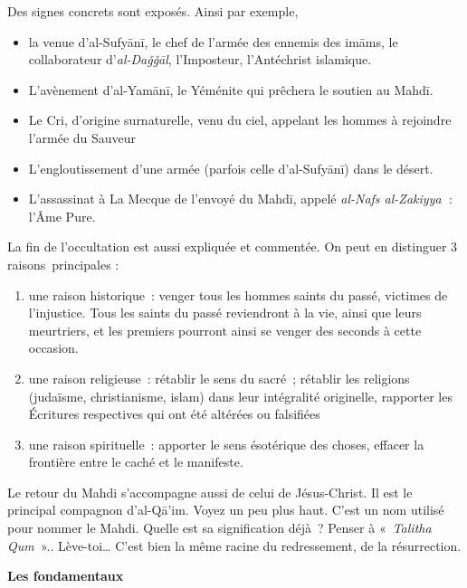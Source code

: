 Des signes concrets sont exposés. Ainsi par exemple,

\begin{itemize}
\item
  la venue d'al-Sufyānī, le chef de l'armée des ennemis des imāms, le
  collaborateur d'\emph{al-Daǧǧāl}, l'Imposteur, l'Antéchrist islamique.
\item
  L'avènement d'al-Yamānī, le Yéménite qui prêchera le soutien au Mahdī.
\item
  Le Cri, d'origine surnaturelle, venu du ciel, appelant les hommes à
  rejoindre l'armée du Sauveur
\item
  L'engloutissement d'une armée (parfois celle d'al-Sufyānī) dans le
  désert.
\item
  L'assassinat à La Mecque de l'envoyé du Mahdī, appelé \emph{al-Nafs
  al-Zakiyya\textbf{~}}: l'Âme Pure.
\end{itemize}

La fin de l'occultation est aussi expliquée et commentée. On peut en
distinguer 3 raisons~principales :
\begin{enumerate}
    \item une raison historique~: venger tous les hommes saints du passé,
victimes de l'injustice. Tous les saints du passé reviendront à la vie,
ainsi que leurs meurtriers, et les premiers pourront ainsi se venger des
seconds à cette occasion.
\item une raison religieuse~: rétablir le sens du sacré~; rétablir les
religions (judaïsme, christianisme, islam) dans leur intégralité
originelle, rapporter les Écritures respectives qui ont été altérées ou
falsifiées
\item une raison spirituelle~: apporter le sens ésotérique des choses,
effacer la frontière entre le caché et le manifeste.
\end{enumerate}
 

Le retour du Mahdi s'accompagne aussi de celui de Jésus-Christ. Il est
le principal compagnon d'al-Qā'im. Voyez un peu plus haut. C'est un nom
utilisé pour nommer le Mahdi. Quelle est sa signification déjà~? Penser
à «~\emph{Talitha Qum~}».. Lève-toi\ldots{} C'est bien la même racine du
redressement, de la résurrection.


\textbf{Les fondamentaux}

